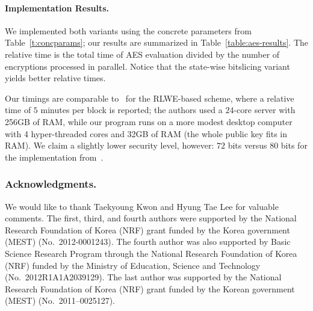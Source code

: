 \documentclass{llncs}
\newcommand*\swbs{state-wise bitslicing\xspace}
\begin{document}
\paragraph{Implementation Results.} We implemented both variants
using the concrete parameters from Table~\ref{t:concparams}; our
results are summarized in 
Table~\ref{table:aes-results}. The 
relative time is the total time of AES evaluation divided  by the
number of encryptions processed in parallel. Notice that the \swbs variant
yields  better relative times. 

Our timings are comparable to~\cite{GHS2012c} for the RLWE-based scheme, where a relative time of $5$ minutes per block is
reported; the authors used a $24$-core server with 256GB of RAM, while
our program runs on a more modest desktop computer with 4 hyper-threaded cores and
32GB of RAM (the whole public key fits in RAM).
We claim a slightly lower security level, however: $72$ bits versus $80$
bits for the implementation from~\cite{GHS2012c}.

\subsubsection*{Acknowledgments.} We would like to thank Taekyoung Kwon and Hyung Tae Lee for valuable comments. 
The first, third, and fourth authors were supported by the National Research Foundation of Korea (NRF) grant funded by the Korea government (MEST) (No.~2012-0001243).
The fourth author was also supported by 
Basic Science Research Program through the National Research Foundation of Korea (NRF) funded by the Ministry of Education, Science and Technology (No.~2012R1A1A2039129).  The last author was supported by the National Research Foundation of Korea (NRF) grant funded by the Korean government (MEST) (No.~2011--0025127).
%


\end{document}
